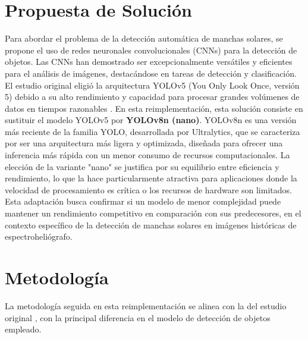 \documentclass[journal]{IEEEtran}
\begin{document}
\section{Propuesta de Solución}
Para abordar el problema de la detección automática de manchas solares, se propone el uso de redes neuronales convolucionales (CNNs) para la detección de objetos. Las CNNs han demostrado ser excepcionalmente versátiles y eficientes para el análisis de imágenes, destacándose en tareas de detección y clasificación. El estudio original eligió la arquitectura YOLOv5 (You Only Look Once, versión 5) debido a su alto rendimiento y capacidad para procesar grandes volúmenes de datos en tiempos razonables \cite{Santos2023}. En esta reimplementación, esta solución consiste en sustituir el modelo YOLOv5 por \textbf{YOLOv8n (nano)}. YOLOv8n es una versión más reciente de la familia YOLO, desarrollada por Ultralytics, que se caracteriza por ser una arquitectura más ligera y optimizada, diseñada para ofrecer una inferencia más rápida con un menor consumo de recursos computacionales. La elección de la variante "nano" se justifica por su equilibrio entre eficiencia y rendimiento, lo que la hace particularmente atractiva para aplicaciones donde la velocidad de procesamiento es crítica o los recursos de hardware son limitados. Esta adaptación busca confirmar si un modelo de menor complejidad puede mantener un rendimiento competitivo en comparación con sus predecesores, en el contexto específico de la detección de manchas solares en imágenes históricas de espectroheliógrafo.
\section{Metodología}
La metodología seguida en esta reimplementación se alinea con la del estudio original \cite{Santos2023}, con la principal diferencia en el modelo de detección de objetos empleado.
\end{document}
